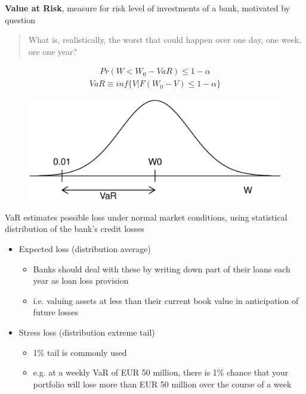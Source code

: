 \documentclass{beamer}
\begin{document}
\begin{frame} 
  \textbf{Value at Risk}, measure for risk level of investments of a bank, motivated by question
  \begin{quote}
    What is, realistically, the worst that could happen over one day, one week, ore one year?
  \end{quote}
  \begin{align}
    Pr(W<W_0-VaR)\leq 1-\alpha
  \end{align}
  \begin{align}
    VaR \equiv inf\{V|F(W_0-V)\leq1-\alpha\}
  \end{align}
\end{frame}

\begin{frame}
  \begin{figure}
    \includegraphics[scale=.3]{VaR.eps}
  \end{figure}
\end{frame}


\begin{frame}
  VaR estimates possible loss under normal market conditions, using statistical distribution of the bank's credit losses
\begin{itemize}
  \item Expected loss (distribution average) 
  \begin{itemize}
    \item Banks should deal with these by writing down part of their loans each year as loan loss provision
    \item i.e. valuing assets at less than their current book value in anticipation of future losses
  \end{itemize}
  \item Stress loss (distribution extreme tail)
  \begin{itemize}
    \item 1\% tail is commonly used
    \item e.g. at a weekly VaR of EUR 50 million, there is  1\% chance that your portfolio will lose more than EUR 50 million over the course of a week 
  \end{itemize}
\end{itemize}
\end{frame}
\end{document}
